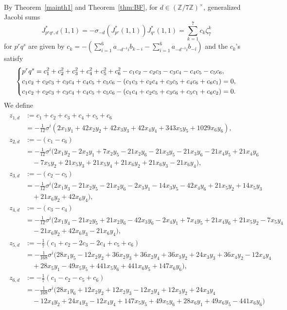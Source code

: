 \documentclass[a4paper, 11pt]{amsart}
\newcommand{\Z}{\mathbb Z}
\theoremstyle{plain}
\theoremstyle{definition}
\numberwithin{equation}{section}
\begin{document}
By Theorem~\ref{mainth1} and Theorem~\ref{thm:BF},
for $d\in(\Z/7\Z)^{\times}$, 
generalized Jacobi sums
\[
J^\ast_{p^rq^s,d}(1,1)
=-\sigma_{-d}(J^\ast_{p^r}(1,1))J^\ast_{q^s}(1,1)=\sum_{k=1}^{7}c_k\zeta_7^k
\]
for $p^rq^s$ are given by 
$c_k=-(\sum_{i=1}^{6}a_{-d^{-1}i}b_{k-i} - \sum_{i=1}^{6}a_{-d^{-1}i}b_{-i})$
and the $c_k$'s satisfy
\begin{align}\label{eq:DS7c}
\begin{dcases}
p^rq^s=
c_1^2+c_2^2+c_3^2+c_4^2+c_5^2+c_6^2- c_1c_2-c_2c_3-c_3c_4-c_4c_5-c_5c_6,\\
c_1c_2+c_2c_3+c_3c_4+c_4c_5+c_5c_6-(c_1c_3+c_2c_4+c_3c_5+c_4c_6+c_6c_1)=0,\\
c_1c_2+c_2c_3+c_3c_4+c_4c_5+c_5c_6-(c_1c_4+c_2c_5+c_3c_6+c_5c_1+c_6c_2)=0.
\end{dcases}
\end{align}
We define
\begin{align}\label{eq:BF7}
\begin{split}
z_{1,d}&:=c_1+c_2+c_3+c_4+c_5+c_6\\
&=-\frac{1}{12}\sigma^i(2 x_1 y_1 + 42 x_2 y_2 + 42 x_3 y_3 + 42 x_4 y_4 + 343 x_5 y_5 + 1029 x_6 y_6),\\
z_{2,d}&:=-(c_1-c_6)\\
&=-\frac{1}{12}\sigma^i(
2 x_1 y_2 
- 2 x_2 y_1 
+ 7 x_2 y_5 
- 21 x_2 y_6
- 21 x_3 y_5 
- 21 x_3 y_6
- 21 x_4 y_5 
+ 21 x_4 y_6\\
&\quad 
- 7 x_5 y_2
+ 21 x_5 y_3 
+ 21 x_5 y_4 
+ 21 x_6 y_2 
+ 21 x_6 y_3
- 21 x_6 y_4
),\\
z_{3,d}&:=-(c_2-c_5)\\
&=-\frac{1}{12}\sigma^i(
2 x_1 y_3 
- 21 x_2 y_5
- 21 x_2 y_6
- 2 x_3 y_1
- 14 x_3 y_5
- 42 x_4 y_6
+ 21 x_5 y_2
+ 14 x_5 y_3\\
&\quad 
+ 21 x_6 y_2
+ 42 x_6 y_4 
),\\
z_{4,d}&:=-(c_3-c_4)\\
&=-\frac{1}{12}\sigma^i(
2 x_1 y_4
- 21 x_2 y_5
+ 21 x_2 y_6
- 42 x_3 y_6
-2 x_4 y_1
+ 7 x_4 y_5
+ 21 x_4 y_6
+ 21 x_5 y_2
- 7 x_5 y_4\\
&\quad 
- 21 x_6 y_2
+ 42 x_6 y_3
- 21 x_6 y_4
 ),\\
z_{5,d}&:=-\frac{1}{7}(c_1+c_2-2c_3-2c_4+c_5+c_6)\\
&=-\frac{1}{168}\sigma^i(
28 x_1 y_5
- 12 x_2 y_2
+ 36 x_2 y_3
+ 36 x_2 y_4
+ 36 x_3 y_2
+ 24 x_3 y_3
+ 36 x_4 y_2
- 12 x_4 y_4 \\
&\quad 
+ 28 x_5 y_1
- 49 x_5 y_5
+ 441 x_5 y_6
+ 441 x_6 y_5
+ 147 x_6 y_6
),\\
z_{6,d}&:=-\frac{1}{7}(c_1-c_2-c_5+c_6)\\
&=-\frac{1}{168}\sigma^i(
28 x_1 y_6
+ 12 x_2 y_2
+ 12 x_2 y_3
- 12 x_2 y_4
+ 12 x_3 y_2
+ 24 x_3 y_4 \\
&\quad 
- 12 x_4 y_2
+ 24 x_4 y_3
 - 12 x_4 y_4 
+ 147 x_5 y_5
+ 49 x_5 y_6 
+ 28 x_6 y_1
+ 49 x_6 y_5
- 441 x_6 y_6
) 
\end{split}
\end{align}
\end{document}
